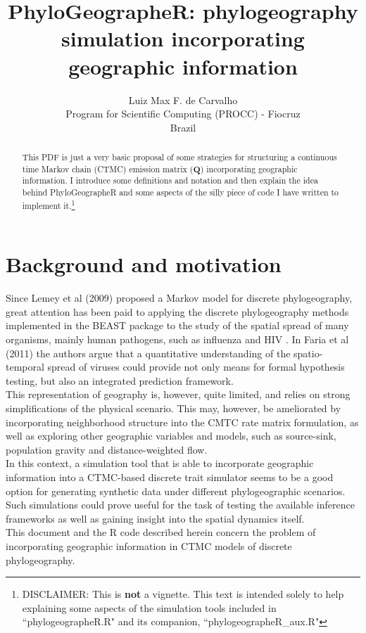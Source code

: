 \documentclass[a4paper,10pt]{article}
\title {PhyloGeographeR: phylogeography simulation incorporating geographic information}
\author{Luiz Max F. de Carvalho\\
Program for Scientific Computing (PROCC) - Fiocruz\\
Brazil}
\begin{document}
\maketitle
\begin{abstract}
This PDF is just a very basic proposal of some strategies for structuring a continuous time Markov chain (CTMC) emission matrix ($\mathbf{Q}$) incorporating geographic information. I introduce some definitions and notation and then explain the idea behind PhyloGeographeR and some aspects of the silly piece of code I have written to implement it.\footnote{DISCLAIMER: This is \textbf{not} a vignette. This text is intended solely to help explaining some aspects of the simulation tools included in ``phylogeographeR.R" and its companion, ``phylogeographeR\_aux.R"}
\end{abstract}
\section{Background and motivation}
\indent Since Lemey et al (2009) \cite{Lemey2009} proposed a Markov model for discrete phylogeography, great attention has been paid to applying the discrete phylogeography methods implemented in the BEAST package to the study of the spatial spread of many organisms, mainly human pathogens, such as influenza \cite{Nelson2011,Bahl2011} and HIV \cite{Faria2012a,Faria2012b}. In Faria et al (2011) \cite{Faria2011} the authors argue that a quantitative understanding of the spatio-temporal spread of viruses could provide not only means for formal hypothesis testing, but also an integrated prediction framework.\\
\indent This representation of geography is, however, quite limited, and relies on strong simplifications of the physical scenario. This may, however, be ameliorated by incorporating neighborhood structure into the CMTC rate matrix formulation, as well as exploring other geographic variables and models, such as source-sink, population gravity and distance-weighted flow.\\ 
\indent In this context, a simulation tool that is able to  incorporate geographic information into a CTMC-based discrete trait simulator seems to be a good option for generating synthetic data under different phylogeographic scenarios. Such simulations could prove useful for the task of testing the available inference frameworks as well as gaining insight into the spatial dynamics itself.\\ 
\indent This document and the R code described herein concern the problem of incorporating geographic information in CTMC models of discrete phylogeography.\\
\end{document}
